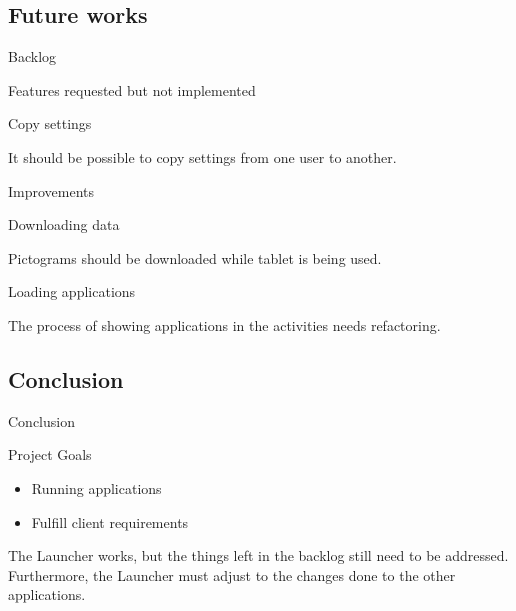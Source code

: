 \subsection{Future works}
\begin{frame}{Backlog}
	
	\begin{block}{Features requested but not implemented}
	\begin{description}
		\item[Copy settings]{}
		\end{description}
	\vspace{-0.5em}
		It should be possible to copy settings from one user to another.
	\end{block}
	\vspace{\baselineskip}
	
	\begin{block}{Improvements}
	\begin{description}
		\item[Downloading data]{}
	\end{description}
	\vspace{-0.5em}
	Pictograms should be downloaded while tablet is being used.
	\vspace{1em}
	\begin{description}
		\item[Loading applications]{}
	\end{description}
	\vspace{-0.5em}
	The process of showing applications in the activities needs refactoring.
	\end{block}
\end{frame}

\subsection{Conclusion}
\begin{frame}{Conclusion}
\begin{block}{Project Goals}
	\begin{itemize}
		\item Running applications
		\item Fulfill client requirements
	\end{itemize}
\end{block}
\vspace{1em}
\pause
	The Launcher works, but the things left in the backlog still need to be addressed.\\
	Furthermore, the Launcher must adjust to the changes done to the other applications.
\end{frame}